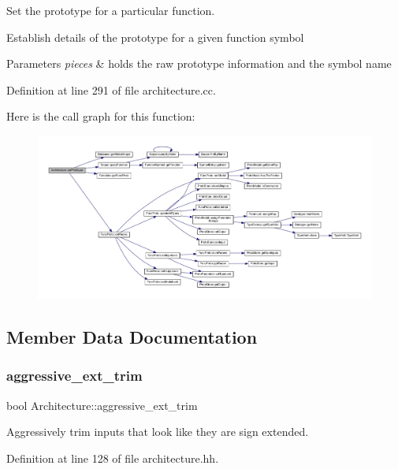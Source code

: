 Set the prototype for a particular function. 

Establish details of the prototype for a given function symbol 
\begin{DoxyParams}{Parameters}
{\em pieces} & holds the raw prototype information and the symbol name \\
\hline
\end{DoxyParams}


Definition at line 291 of file architecture.\+cc.

Here is the call graph for this function\+:
\nopagebreak
\begin{figure}[H]
\begin{center}
\leavevmode
\includegraphics[width=350pt]{class_architecture_a10d78ec7be0df339288b7b3adc4c38e7_cgraph}
\end{center}
\end{figure}


\subsection{Member Data Documentation}
\mbox{\label{class_architecture_a51c3648c6133efc1d5115b86dd10115a}} 
\subsubsection{\texorpdfstring{aggressive\_ext\_trim}{aggressive\_ext\_trim}}
{\footnotesize\ttfamily bool Architecture\+::aggressive\+\_\+ext\+\_\+trim}



Aggressively trim inputs that look like they are sign extended. 



Definition at line 128 of file architecture.\+hh.

